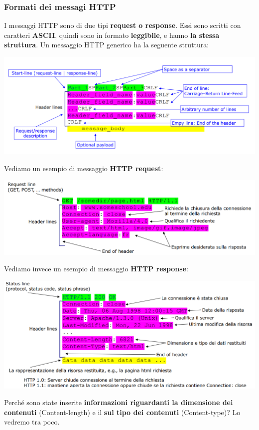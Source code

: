 \documentclass[12pt]{article}
\begin{document}
\subsubsection{Formati dei messagi HTTP}
I messaggi HTTP sono di due tipi \textbf{request o response}. Essi sono scritti con caratteri \textbf{ASCII}, quindi sono in formato \textbf{leggibile}, e hanno \textbf{la stessa struttura}. Un messaggio HTTP generico ha la seguente struttura:
\begin{center}
    \includegraphics[width = 1.15\textwidth]{Images/117.PNG}
\end{center}
Vediamo un esempio di messaggio \textbf{HTTP request}:
\begin{center}
    \includegraphics[width = 1.15\textwidth]{Images/118.PNG}
\end{center}
Vediamo invece un esempio di messaggio \textbf{HTTP response}:
\begin{center}
    \includegraphics[width = 1.15\textwidth]{Images/119.PNG}
\end{center}
Perché sono state inserite \textbf{informazioni riguardanti la dimensione dei contenuti} (Content-length) e il \textbf{sul tipo dei contenuti} (Content-type)? Lo vedremo tra poco.
\end{document}
